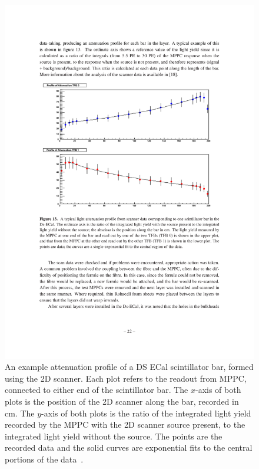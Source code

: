 \begin{figure}[t!]
  \centering
  \includegraphics[width=14cm]{images/t2k/DSECal_Bar_Attenuation_Profile.pdf}
  \caption{An example attenuation profile of a DS ECal scintillator bar, formed using the 2D scanner.  Each plot refers to the readout from MPPC, connected to either end of the scintillator bar.  The $x$-axis of both plots is the position of the 2D scanner along the bar, recorded in cm.  The $y$-axis of both plots is the ratio of the integrated light yield recorded by the MPPC with the 2D scanner source present, to the integrated light yield without the source.  The points are the recorded data and the solid curves are exponential fits to the central portions of the data~\cite{1748-0221-8-10-P10019}.}
  \label{fig:DSECalBarAttenuationProfile}
\end{figure}
\newline
\newline
